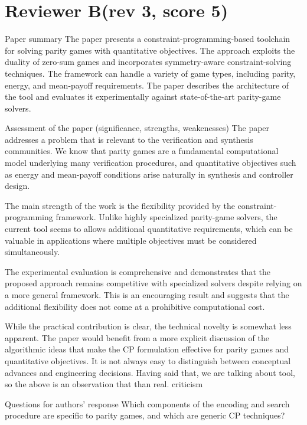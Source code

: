 
\section{Reviewer B(rev 3, score 5)}\label{rev:B}
\begin{reviewer}
Paper summary
The paper presents a constraint-programming-based toolchain for solving parity games with quantitative objectives. The approach exploits the duality of zero-sum games and incorporates symmetry-aware constraint-solving techniques. The framework can handle a variety of game types, including parity, energy, and mean-payoff requirements. The paper describes the architecture of the tool and evaluates it experimentally against state-of-the-art parity-game solvers.

Assessment of the paper (significance, strengths, weakenesses)
The paper addresses a problem that is relevant to the verification and synthesis communities. We know that parity games are a fundamental computational model underlying many verification procedures, and quantitative objectives such as energy and mean-payoff conditions arise naturally in synthesis and controller design.

The main strength of the work is the flexibility provided by the constraint-programming framework. Unlike highly specialized parity-game solvers, the current tool seems to allows additional quantitative requirements, which can be valuable in applications where multiple objectives must be considered simultaneously.

The experimental evaluation is comprehensive and demonstrates that the proposed approach remains competitive with specialized solvers despite relying on a more general framework. This is an encouraging result and suggests that the additional flexibility does not come at a prohibitive computational cost.

While the practical contribution is clear, the technical novelty is somewhat less apparent. The paper would benefit from a more explicit discussion of the algorithmic ideas that make the CP formulation effective for parity games and quantitative objectives. It is not always easy to distinguish between conceptual advances and engineering decisions. Having said that, we are talking about tool, so the above is an observation that than real. criticism

Questions for authors’ response
Which components of the encoding and search procedure are specific to parity games, and which are generic CP techniques?
\end{reviewer}


